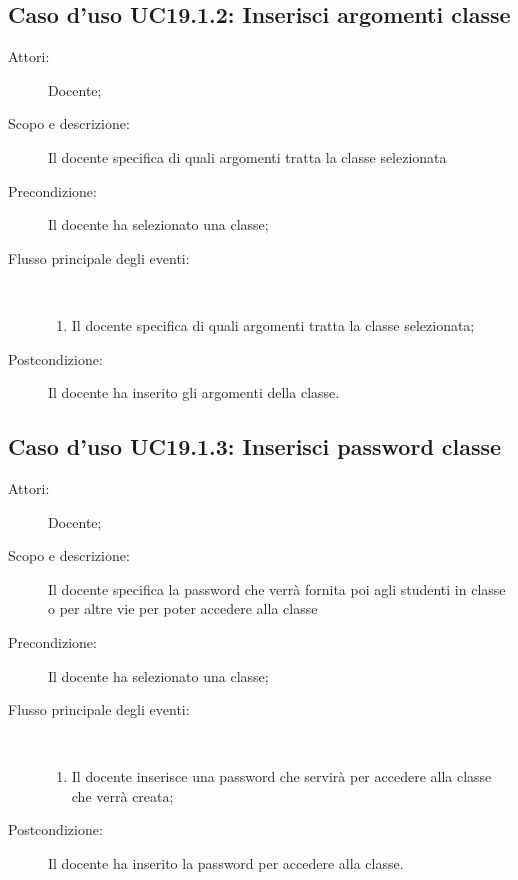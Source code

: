 \subsection{Caso d'uso UC19.1.2: Inserisci argomenti classe}\begin{description}
	\item[Attori:] Docente;
	\item[Scopo e descrizione:] Il docente specifica di quali argomenti tratta la classe selezionata
	\item[Precondizione:] Il docente ha selezionato una classe;
	
	\item[Flusso principale degli eventi:] \ 
	\begin{enumerate}
		\item Il docente specifica di quali argomenti tratta la classe selezionata;
		
	\end{enumerate}
	\item[Postcondizione:] Il docente ha inserito gli argomenti della classe.
\end{description}
\hypertarget{UC19.1.3}{}
\subsection{Caso d'uso UC19.1.3: Inserisci password classe}\begin{description}
	\item[Attori:] Docente;
	\item[Scopo e descrizione:] Il docente specifica la password che verrà fornita poi agli studenti in classe o per altre vie per poter accedere alla classe
	\item[Precondizione:] Il docente ha selezionato una classe;
	
	\item[Flusso principale degli eventi:] \ 
	\begin{enumerate}
		\item Il docente inserisce una password che servirà per accedere alla classe che verrà creata;
		
	\end{enumerate}
	\item[Postcondizione:] Il docente ha inserito la password per accedere alla classe.
\end{description}
\hypertarget{UC19.2}{}
